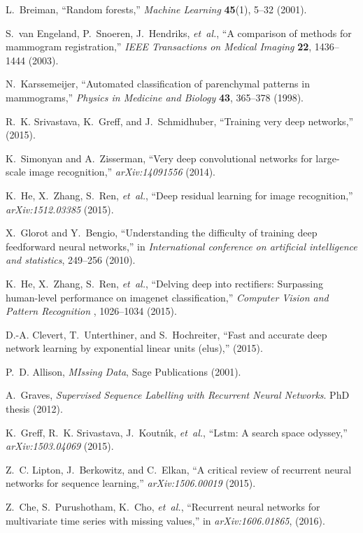 \documentclass[12pt]{spieman}  %
\begin{document}
\begin{thebibliography}{10}
L.~Breiman, ``Random forests,'' {\em Machine Learning} {\bf 45}(1), 5--32
  (2001).

S.~van Engeland, P.~Snoeren, J.~Hendriks, {\em et~al.}, ``A comparison of
  methods for mammogram registration,'' {\em IEEE Transactions on Medical
  Imaging} {\bf 22}, 1436--1444  (2003).

N.~Karssemeijer, ``Automated classification of parenchymal patterns in
  mammograms,'' {\em Physics in Medicine and Biology} {\bf 43}, 365--378
  (1998).

R.~K. Srivastava, K.~Greff, and J.~Schmidhuber, ``Training very deep
  networks,''  (2015).

K.~Simonyan and A.~Zisserman, ``Very deep convolutional networks for
  large-scale image recognition,'' {\em arXiv:14091556}   (2014).

K.~He, X.~Zhang, S.~Ren, {\em et~al.}, ``Deep residual learning for image
  recognition,'' {\em arXiv:1512.03385}   (2015).

X.~Glorot and Y.~Bengio, ``Understanding the difficulty of training deep
  feedforward neural networks,'' in {\em International conference on artificial
  intelligence and statistics},  249--256  (2010).

K.~He, X.~Zhang, S.~Ren, {\em et~al.}, ``Delving deep into rectifiers:
  Surpassing human-level performance on imagenet classification,'' {\em
  Computer Vision and Pattern Recognition} , 1026--1034  (2015).

D.-A. Clevert, T.~Unterthiner, and S.~Hochreiter, ``Fast and accurate deep
  network learning by exponential linear units (elus),''  (2015).

P.~D. Allison, {\em MIssing Data}, Sage Publications  (2001).

A.~Graves, {\em Supervised Sequence Labelling with Recurrent Neural Networks}.
\newblock PhD thesis  (2012).

K.~Greff, R.~K. Srivastava, J.~Koutn{\'\i}k, {\em et~al.}, ``Lstm: A search
  space odyssey,'' {\em arXiv:1503.04069}   (2015).

Z.~C. Lipton, J.~Berkowitz, and C.~Elkan, ``A critical review of recurrent
  neural networks for sequence learning,'' {\em arXiv:1506.00019}   (2015).

Z.~Che, S.~Purushotham, K.~Cho, {\em et~al.}, ``Recurrent neural networks for
  multivariate time series with missing values,'' in {\em arXiv:1606.01865},
  (2016).


\end{thebibliography}
\end{document}
